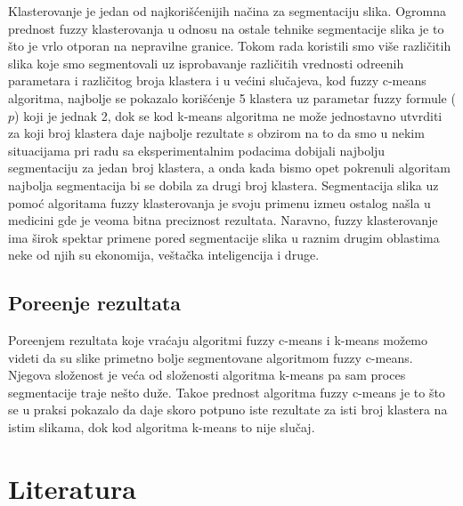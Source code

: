 \documentclass{article}
\begin{document}
Klasterovanje je jedan od najkori\v{s}\'{c}enijih na\v{c}ina za segmentaciju slika. Ogromna prednost {\selectfont fuzzy} klasterovanja u odnosu na ostale tehnike segmentacije slika je to \v{s}to je vrlo otporan na nepravilne granice. Tokom rada koristili smo vi\v{s}e razli\v{c}itih slika koje smo segmentovali uz isprobavanje razli\v{c}itih vrednosti odre\dj enih parametara i razli\v{c}itog broja klastera i u ve\'{c}ini slu\v{c}ajeva, kod {\selectfont fuzzy c-means} algoritma, najbolje se pokazalo kori\v{s}\'{c}enje 5 klastera uz parametar {\selectfont fuzzy} formule ($p$) koji je jednak 2, dok se kod {\selectfont k-means} algoritma ne mo\v{z}e jednostavno utvrditi za koji broj klastera daje najbolje rezultate s obzirom na to da smo u nekim situacijama pri radu sa eksperimentalnim podacima dobijali najbolju segmentaciju za jedan broj klastera, a onda kada bismo opet pokrenuli algoritam najbolja segmentacija bi se dobila za drugi broj klastera. Segmentacija slika uz pomo\'{c} algoritama {\selectfont fuzzy} klasterovanja je svoju primenu izme\dj u ostalog na\v{s}la u medicini gde je veoma bitna preciznost rezultata. Naravno, {\selectfont fuzzy} klasterovanje ima \v{s}irok spektar primene pored segmentacije slika u raznim drugim oblastima neke od njih su ekonomija, ve\v{s}ta\v{c}ka inteligencija i druge.

\subsection{\selectfont Pore\dj enje rezultata}

Pore\dj enjem rezultata koje vra\'{c}aju algoritmi {\selectfont fuzzy c-means} i {\selectfont k-means} mo\v{z}emo videti da su slike primetno bolje segmentovane algoritmom {\selectfont fuzzy c-means}. Njegova slo\v{z}enost je ve\'{c}a od slo\v{z}enosti algoritma {\selectfont k-means} pa sam proces segmentacije traje ne\v{s}to du\v{z}e. Tako\dj e prednost algoritma {\selectfont fuzzy c-means} je to \v{s}to se u praksi pokazalo da daje skoro potpuno iste rezultate za isti broj klastera na istim slikama, dok kod algoritma {\selectfont k-means} to nije slu\v{c}aj.

\newpage
\section{\selectfont Literatura}
\end{document}
